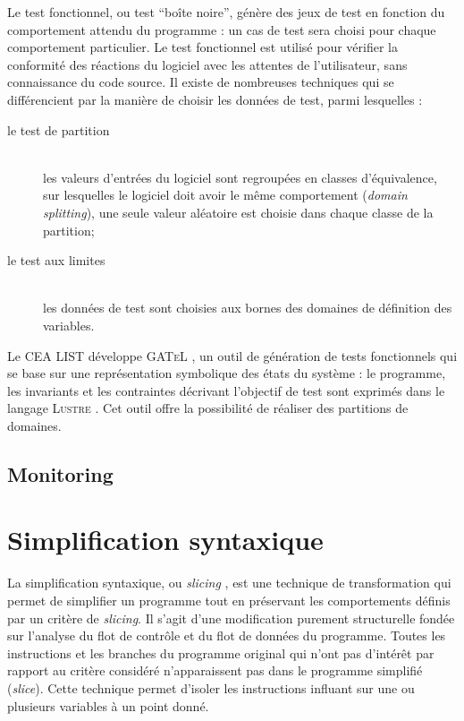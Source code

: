 Le test fonctionnel, ou test ``boîte noire'', génère des jeux de test en
fonction du comportement attendu du programme : un cas de test sera choisi pour
chaque comportement particulier. Le test fonctionnel est utilisé pour vérifier
la conformité des réactions du logiciel avec les attentes de l'utilisateur, sans
connaissance du code source. Il existe de nombreuses techniques qui se
différencient par la manière de choisir les données de test, parmi lesquelles :

\begin{description}
\item[le test de partition] \hfill \\
les valeurs d’entrées du logiciel sont regroupées en classes d’équivalence, sur
lesquelles le logiciel doit avoir le même comportement ({\em domain splitting}),
une seule valeur aléatoire est choisie dans chaque classe de la partition;
\item[le test aux limites] \hfill \\
les données de test sont choisies aux bornes des domaines de définition des
variables.
\end{description}

Le CEA LIST développe \textsc{GATeL} \cite{GATEL}, un outil de génération de
tests fonctionnels qui se base sur une représentation symbolique des états du
système : le programme, les invariants et les contraintes décrivant l'objectif
de test sont exprimés dans le langage \textsc{Lustre} \cite{Lustre}. Cet outil
offre la possibilité de réaliser des partitions de domaines.



\subsection{Monitoring}
\label{sec:monitoring}



\section{Simplification syntaxique}

La simplification syntaxique, ou {\em slicing} \cite{slicing}, est une technique
de transformation qui permet de simplifier un programme tout en préservant les
comportements définis par un critère de {\em slicing}. Il s’agit d’une
modification purement structurelle fondée sur l'analyse du flot de contrôle et
du flot de données du programme. Toutes les instructions et les branches du
programme original qui n’ont pas d’intérêt par rapport au critère considéré
n’apparaissent pas dans le programme simplifié ({\em slice}). Cette technique
permet d’isoler les instructions influant sur une ou plusieurs variables à un
point donné.\\

